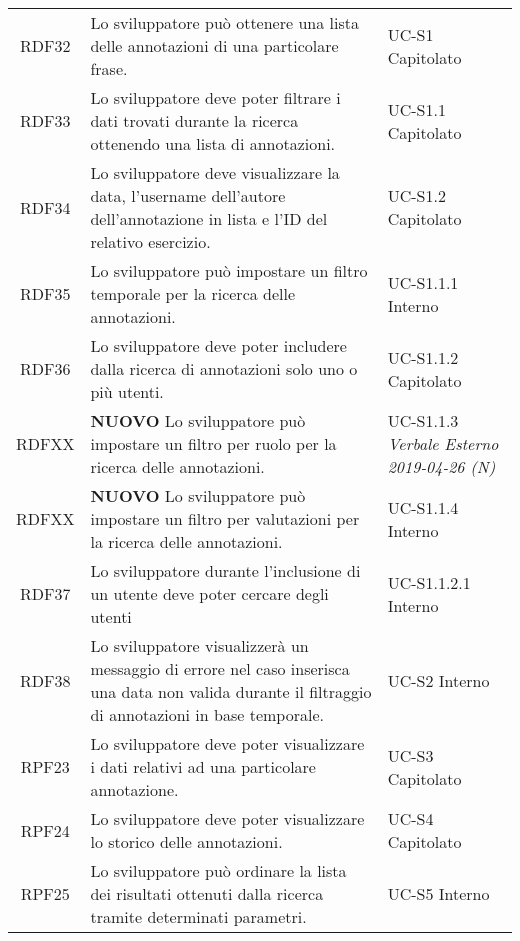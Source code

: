 \begin{tabularx}{\textwidth}{| c | p{10cm} | X |}
		RDF32 & Lo sviluppatore può ottenere una lista delle annotazioni di una particolare frase. & UC-S1 \newline Capitolato\\
		RDF33 & Lo sviluppatore deve poter filtrare i dati trovati durante la ricerca ottenendo una lista di annotazioni. & UC-S1.1 \newline Capitolato\\
		RDF34 & Lo sviluppatore deve visualizzare la data, l'username dell'autore dell'annotazione in lista e l'ID del relativo esercizio. & UC-S1.2 \newline Capitolato\\
		RDF35 & Lo sviluppatore può impostare un filtro temporale per la ricerca delle annotazioni. & UC-S1.1.1 \newline Interno\\
		RDF36 & Lo sviluppatore deve poter includere dalla ricerca di annotazioni solo uno o più utenti. & UC-S1.1.2 \newline Capitolato\\
		RDFXX & \textbf{NUOVO} Lo sviluppatore può impostare un filtro per ruolo per la ricerca delle annotazioni. & UC-S1.1.3 \newline \textit{Verbale Esterno 2019-04-26 (N)}\\
		RDFXX & \textbf{NUOVO} Lo sviluppatore può impostare un filtro per valutazioni per la ricerca delle annotazioni. & UC-S1.1.4 \newline Interno\\
		RDF37 & Lo sviluppatore durante l'inclusione di un utente deve poter cercare degli utenti & UC-S1.1.2.1 \newline Interno\\		
		RDF38 & Lo sviluppatore visualizzerà un messaggio di errore nel caso inserisca una data non valida durante il filtraggio di annotazioni in base temporale. & UC-S2 \newline Interno\\
		RPF23 & Lo sviluppatore deve poter visualizzare i dati relativi ad una particolare annotazione. & UC-S3 \newline Capitolato\\
		RPF24 & Lo sviluppatore deve poter visualizzare lo storico delle annotazioni. & UC-S4 \newline Capitolato\\
		RPF25 & Lo sviluppatore può ordinare la lista dei risultati ottenuti dalla ricerca tramite determinati parametri. & UC-S5 \newline Interno\\	

\end{tabularx}
